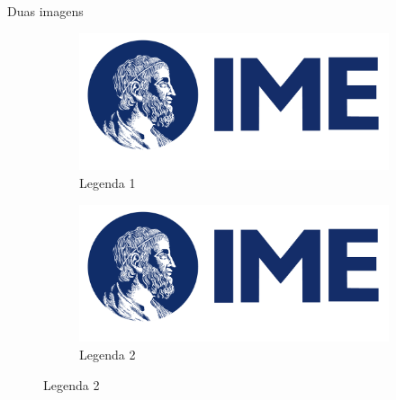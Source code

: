 \begin{frame}{Duas imagens}
   \begin{figure}
       \centering
       \begin{subfigure}[b]{0.45\textwidth}
           \centering
           \includegraphics[width=\textwidth]{img/logo_IME.png}
           \caption{Legenda 1}
           \label{fig:img1}
       \end{subfigure}
       \hfill
       \begin{subfigure}[b]{0.45\textwidth}
           \centering
           \includegraphics[width=\textwidth]{img/logo_IME.png}
           \caption{Legenda 2}
           \label{fig:img2}
       \end{subfigure}
   \end{figure}
\end{frame}

